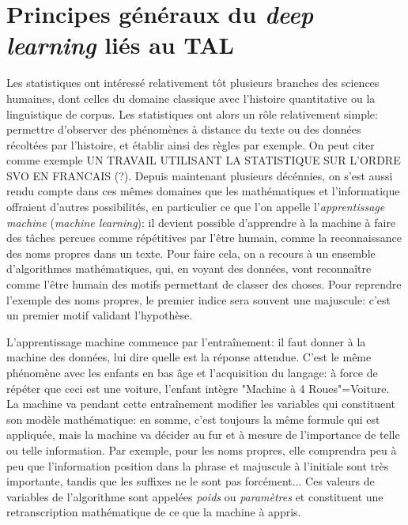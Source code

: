 \section{Principes généraux du \textit{deep learning} liés au TAL}

Les statistiques ont intéressé relativement tôt plusieurs branches des sciences humaines, dont celles du domaine classique avec l'histoire quantitative ou la linguistique de corpus. Les statistiques ont alors un rôle relativement simple: permettre d'observer des phénomènes à distance du texte ou des données récoltées par l'histoire, et établir ainsi des règles par exemple. On peut citer comme exemple UN TRAVAIL UTILISANT LA STATISTIQUE SUR L'ORDRE SVO EN FRANCAIS (?). Depuis maintenant plusieurs décénnies, on s'est aussi rendu compte dans ces mêmes domaines que les mathématiques et l'informatique offraient d'autres possibilités, en particulier ce que l'on appelle l'\textit{apprentissage machine} (\textit{machine learning}): il devient possible d'apprendre à la machine à faire des tâches percues comme répétitives par l'être humain, comme la reconnaissance des noms propres dans un texte. Pour faire cela, on a recours à un ensemble d'algorithmes mathématiques, qui, en voyant des données, vont reconnaître comme l'être humain des motifs permettant de classer des choses. Pour reprendre l'exemple des noms propres, le premier indice sera souvent une majuscule: c'est un premier motif validant l'hypothèse.

L'apprentissage machine commence par l'entraînement: il faut donner à la machine des données, lui dire quelle est la réponse attendue. C'est le même phénomène avec les enfants en bas âge et l'acquisition du langage: à force de répéter que ceci est une voiture, l'enfant intègre "Machine à 4 Roues"=Voiture. La machine va pendant cette entraînement modifier les variables qui constituent son modèle mathématique: en somme, c'est toujours la même formule qui est appliquée, mais la machine va décider au fur et à mesure de l'importance de telle ou telle information. Par exemple, pour les noms propres, elle comprendra peu à peu que l'information position dans la phrase et majuscule à l'initiale sont très importante, tandis que les suffixes ne le sont pas forcément... Ces valeurs de variables de l'algorithme sont appelées \textit{poids} ou \textit{paramètres} et constituent une retranscription mathématique de ce que la machine à appris. 

